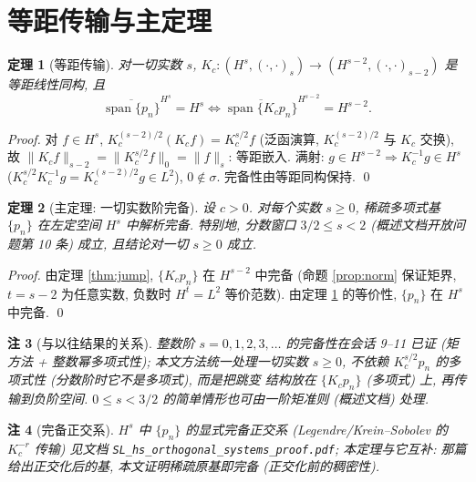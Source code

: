 \documentclass[UTF8]{ctexart}
\newtheorem{theorem}{定理}[section]
\newtheorem{remark}[theorem]{注}
\begin{document}
\section{等距传输与主定理}

\begin{theorem}[等距传输]\label{thm:transport}
	对一切实数 $s$, $K_c: (H^s, (\cdot,\cdot)_s) \to
	(H^{s-2}, (\cdot,\cdot)_{s-2})$ 是等距线性同构, 且
	\[
		\overline{\operatorname{span}\{p_n\}}^{H^s} = H^s
		\iff
		\overline{\operatorname{span}\{K_c p_n\}}^{H^{s-2}} = H^{s-2}.
	\]
\end{theorem}

\begin{proof}
	对 $f \in H^s$, $K_c^{(s-2)/2}(K_c f) = K_c^{s/2}f$ (泛函演算,
	$K_c^{(s-2)/2}$ 与 $K_c$ 交换), 故
	$\|K_c f\|_{s-2} = \|K_c^{s/2}f\|_0 = \|f\|_s$: 等距嵌入.
	满射: $g \in H^{s-2} \Rightarrow K_c^{-1}g \in H^s$
	($K_c^{s/2}K_c^{-1}g = K_c^{(s-2)/2}g \in L^2$), $0 \notin \sigma$.
	完备性由等距同构保持. \qed
\end{proof}

\begin{theorem}[主定理: 一切实数阶完备]\label{thm:main}
	设 $c > 0$. 对每个实数 $s \ge 0$, 稀疏多项式基
	$\{p_n\}$ 在左定空间 $H^s$ 中解析完备.
	特别地, 分数窗口 $3/2 \le s < 2$ (概述文档开放问题第 10 条) 成立,
	且结论对一切 $s \ge 0$ 成立.
\end{theorem}

\begin{proof}
	由定理 \ref{thm:jump}, $\{K_c p_n\}$ 在 $H^{s-2}$ 中完备
	(命题 \ref{prop:norm} 保证矩界, $t = s-2$ 为任意实数, 负数时
	$H^t = L^2$ 等价范数). 由定理 \ref{thm:transport} 的等价性,
	$\{p_n\}$ 在 $H^s$ 中完备. \qed
\end{proof}

\begin{remark}[与以往结果的关系]
	整数阶 $s = 0,1,2,3,\dots$ 的完备性在会话 9--11 已证 (矩方法 +
	整数幂多项式性); 本文方法统一处理一切实数 $s \ge 0$, 不依赖
	$K_c^{s/2}p_n$ 的多项式性 (分数阶时它不是多项式), 而是把跳变
	结构放在 $\{K_c p_n\}$ (多项式) 上, 再传输到负阶空间.
	$0 \le s < 3/2$ 的简单情形也可由一阶矩准则 (概述文档) 处理.
\end{remark}

\begin{remark}[完备正交系]
	$H^s$ 中 $\{p_n\}$ 的显式完备正交系 (Legendre/Krein--Sobolev 的
	$K_c^{-r}$ 传输) 见文档 \texttt{SL\_hs\_orthogonal\_systems\_proof.pdf};
	本定理与它互补: 那篇给出正交化后的基, 本文证明稀疏原基即完备
	(正交化前的稠密性).
\end{remark}
\end{document}
